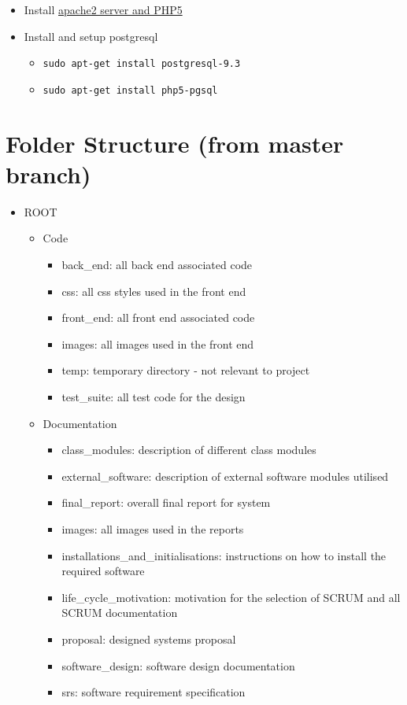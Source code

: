 \documentclass[10pt, a4paper, onecolumn]{scrartcl}
\providecommand{\tightlist}{%
	\setlength{\itemsep}{0pt}\setlength{\parskip}{0pt}}
\begin{document}
	\begin{itemize}
		\tightlist
		\item
		Install
		\href{http://www.howtogeek.com/howto/ubuntu/installing-php5-and-apache-on-ubuntu/}{apache2
			server and PHP5}
		\item
		Install and setup postgresql
		
		\begin{itemize}
			\tightlist
			\item
			\texttt{sudo\ apt-get\ install\ postgresql-9.3}
			\item
			\texttt{sudo\ apt-get\ install\ php5-pgsql}
		\end{itemize}
	\end{itemize}
	
	\section{Folder Structure (from master branch)}
	
	\begin{itemize}
		\item ROOT
		\begin{itemize}
			\item Code
			\begin{itemize}
				\item back\_end: all back end associated code
				\item css: all css styles used in the front end
				\item front\_end: all front end associated code
				\item images: all images used in the front end
				\item temp: temporary directory - not relevant to project
				\item test\_suite: all test code for the design
			\end{itemize}
			\item Documentation
			\begin{itemize}
				\item class\_modules: description of different class modules
				\item external\_software: description of external software modules utilised
				\item final\_report: overall final report for system
				\item images: all images used in the reports
				\item installations\_and\_initialisations: instructions on how to install the required software
				\item life\_cycle\_motivation: motivation for the selection of SCRUM and all SCRUM documentation
				\item proposal: designed systems proposal
				\item software\_design: software design documentation
				\item srs: software requirement specification
			\end{itemize}
		\end{itemize}
	\end{itemize}
	
\end{document}
